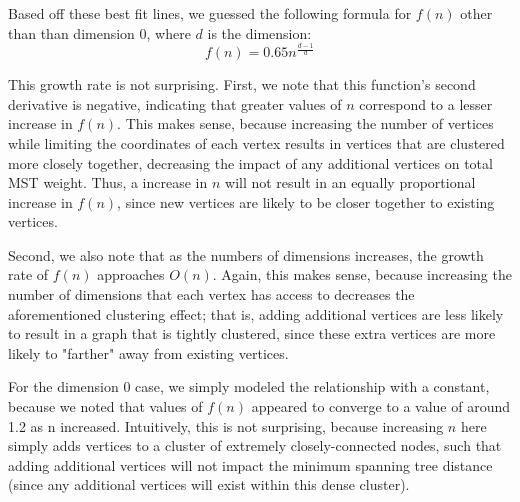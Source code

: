 \documentclass[a4paper]{article}
\begin{document}
Based off these best fit lines, we guessed the following formula for $f(n)$ other than than dimension 0, where $d$ is the dimension:
$$f(n) = 0.65n^{\frac{d-1}{d}}$$

This growth rate is not surprising. First, we note that this function's second derivative is negative, indicating that greater values of $n$ correspond to a lesser increase in $f(n)$. This makes sense, because increasing the number of vertices while limiting the coordinates of each vertex results in vertices that are clustered more closely together, decreasing the impact of any additional vertices on total MST weight. Thus, a increase in $n$ will not result in an equally proportional increase in $f(n)$, since new vertices are likely to be closer together to existing vertices.

Second, we also note that as the numbers of dimensions increases, the growth rate of $f(n)$ approaches $O(n)$. Again, this makes sense, because increasing the number of dimensions that each vertex has access to decreases the aforementioned clustering effect; that is, adding additional vertices are less likely to result in a graph that is tightly clustered, since these extra vertices are more likely to "farther" away from existing vertices.

For the dimension 0 case, we simply modeled the relationship with a constant, because we noted that values of $f(n)$ appeared to converge to a value of around 1.2 as n increased. Intuitively, this is not surprising, because increasing $n$ here simply adds vertices to a cluster of extremely closely-connected nodes, such that adding additional vertices will not impact the minimum spanning tree distance (since any additional vertices will exist within this dense cluster).
\end{document}
